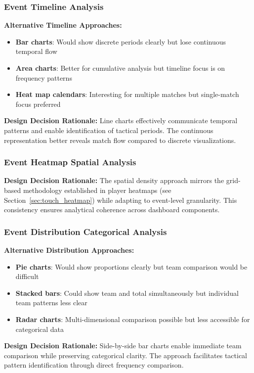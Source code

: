 \documentclass[12pt,a4paper]{article}
\begin{document}
\subsubsection{Event Timeline Analysis}
\textbf{Alternative Timeline Approaches:}
\begin{itemize}
    \item \textbf{Bar charts}: Would show discrete periods clearly but lose continuous temporal flow
    \item \textbf{Area charts}: Better for cumulative analysis but timeline focus is on frequency patterns
    \item \textbf{Heat map calendars}: Interesting for multiple matches but single-match focus preferred
\end{itemize}

\textbf{Design Decision Rationale:}
Line charts effectively communicate temporal patterns and enable identification of tactical periods. The continuous representation better reveals match flow compared to discrete visualizations.

\subsubsection{Event Heatmap Spatial Analysis}
\textbf{Design Decision Rationale:}
The spatial density approach mirrors the grid-based methodology established in player heatmaps (see Section~\ref{sec:touch_heatmap}) while adapting to event-level granularity. This consistency ensures analytical coherence across dashboard components.

\subsubsection{Event Distribution Categorical Analysis}
\textbf{Alternative Distribution Approaches:}
\begin{itemize}
    \item \textbf{Pie charts}: Would show proportions clearly but team comparison would be difficult
    \item \textbf{Stacked bars}: Could show team and total simultaneously but individual team patterns less clear
    \item \textbf{Radar charts}: Multi-dimensional comparison possible but less accessible for categorical data
\end{itemize}

\textbf{Design Decision Rationale:}
Side-by-side bar charts enable immediate team comparison while preserving categorical clarity. The approach facilitates tactical pattern identification through direct frequency comparison.
\end{document}
